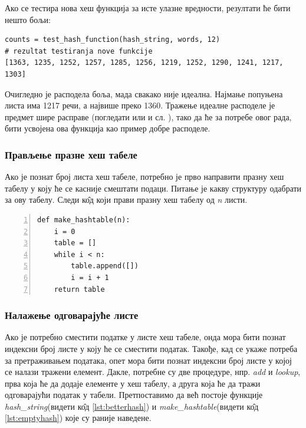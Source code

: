 Ако се тестира нова хеш функција за исте улазне вредности, резултати ће бити нешто бољи:

\begin{lstlisting}[caption = Тестирање "боље" хеш функције,label={lst:betterhashtest}]
counts = test_hash_function(hash_string, words, 12)
# rezultat testiranja nove funkcije
[1363, 1235, 1252, 1257, 1285, 1256, 1219, 1252, 1290, 1241, 1217, 1303]
\end{lstlisting}

Очигледно је расподела боља, мада свакако није идеална. Најмање попуњена листа има 1217 речи, а највише преко 1360. Тражење идеалне расподеле је предмет шире расправе (погледати \cite[поглавље~6.4]{Knuth1998ACP} \cite[поглавље~3]{cormen2001introduction} или \cite{artofhashing} и сл. ), тако да ће за потребе овог рада, бити усвојена ова функција као пример добре расподеле.


\subsubsection{Прављење празне хеш табеле}

Ако је познат број листа хеш табеле, потребно је прво направити празну хеш табелу у коју ће се касније смештати подаци. Питање је какву структуру одабрати за ову табелу. Следи к\^{о}д који прави празну хеш табелу од \emph{n} листи.

\begin{lstlisting}[caption=Празна хеш табела, label={lst:emptyhash}, numbers = left]
def make_hashtable(n):
    i = 0
    table = []
    while i < n:
        table.append([])
        i = i + 1
    return table
\end{lstlisting}

\subsubsection{Налажење одговарајуће листе}

Ако је потребно сместити податке у листе хеш табеле, онда мора бити познат индексни број листе у коју ће се сместити податак. Такође, кад се укаже потреба за  претраживањем података, опет мора бити познат индексни број листе у којој се налази тражени елемент. Дакле, потребне су две процедуре, нпр. \emph{add} и \emph{lookup}, прва која ће да додаје елементе у хеш табелу, а друга која ће да тражи одговарајући податак у табели. Претпоставимо да већ постоје функције \emph{hash\_string}(видети к\^{о}д \ref{lst:betterhash}) и \emph{make\_hashtable}(видети к\^{о}д \ref{lst:emptyhash}) које су раније наведене.


